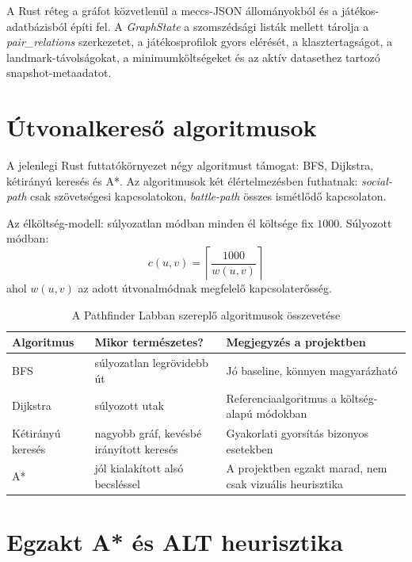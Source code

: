 A Rust réteg a gráfot közvetlenül a meccs-JSON állományokból és a játékos-adatbázisból építi fel. A \textit{GraphState} a szomszédsági listák mellett tárolja a \textit{pair\_relations} szerkezetet, a játékosprofilok gyors elérését, a klasztertagságot, a landmark-távolságokat, a minimumköltségeket és az aktív datasethez tartozó snapshot-metaadatot.

\section{Útvonalkereső algoritmusok}

A jelenlegi Rust futtatókörnyezet négy algoritmust támogat: BFS, Dijkstra, kétirányú keresés és A*. Az algoritmusok két élértelmezésben futhatnak: \textit{social-path} csak szövetségesi kapcsolatokon, \textit{battle-path} összes ismétlődő kapcsolaton.

Az élköltség-modell: súlyozatlan módban minden él költsége fix $1000$. Súlyozott módban:
\begin{equation}
c(u,v)=\left\lceil \frac{1000}{w(u,v)} \right\rceil
\end{equation}
ahol $w(u,v)$ az adott útvonalmódnak megfelelő kapcsolaterősség.

\begin{table}[H]
\centering
\caption{A Pathfinder Labban szereplő algoritmusok összevetése}
\begin{tabularx}{\textwidth}{>{\raggedright\arraybackslash}p{2.8cm} >{\raggedright\arraybackslash}p{2.8cm} X}
\toprule
\textbf{Algoritmus} & \textbf{Mikor természetes?} & \textbf{Megjegyzés a projektben} \\
\midrule
BFS & súlyozatlan legrövidebb út & Jó baseline, könnyen magyarázható \\
Dijkstra & súlyozott utak & Referenciaalgoritmus a költség-alapú módokban \\
Kétirányú keresés & nagyobb gráf, kevésbé irányított keresés & Gyakorlati gyorsítás bizonyos esetekben \\
A* & jól kialakított alsó becsléssel & A projektben egzakt marad, nem csak vizuális heurisztika \\
\bottomrule
\end{tabularx}
\end{table}

\section{Egzakt A* és ALT heurisztika}


